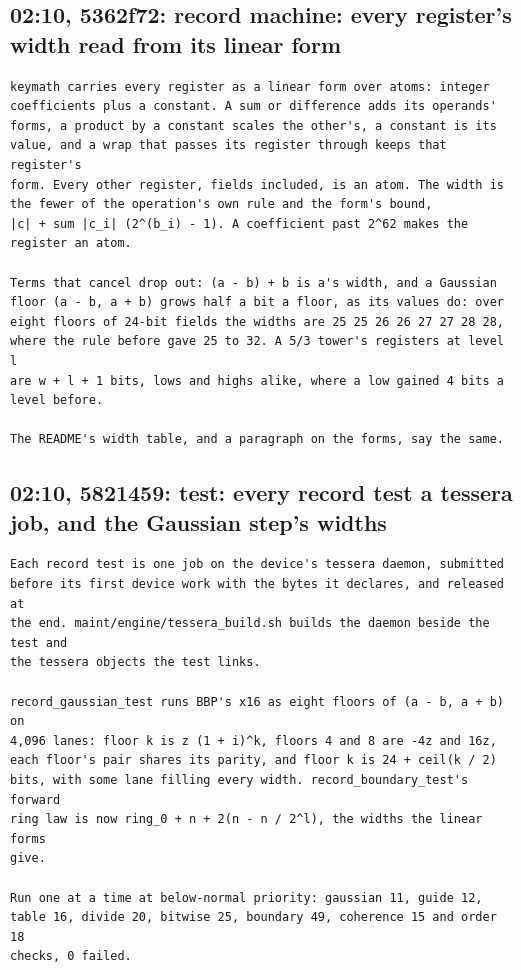 \subsection{\texorpdfstring{02:10, 5362f72: record machine: every register's width read from its linear form}{02:10, 5362f72: record machine: every register's width read from its linear form}}

\begin{Verbatim}
keymath carries every register as a linear form over atoms: integer
coefficients plus a constant. A sum or difference adds its operands'
forms, a product by a constant scales the other's, a constant is its
value, and a wrap that passes its register through keeps that register's
form. Every other register, fields included, is an atom. The width is
the fewer of the operation's own rule and the form's bound,
|c| + sum |c_i| (2^(b_i) - 1). A coefficient past 2^62 makes the
register an atom.

Terms that cancel drop out: (a - b) + b is a's width, and a Gaussian
floor (a - b, a + b) grows half a bit a floor, as its values do: over
eight floors of 24-bit fields the widths are 25 25 26 26 27 27 28 28,
where the rule before gave 25 to 32. A 5/3 tower's registers at level l
are w + l + 1 bits, lows and highs alike, where a low gained 4 bits a
level before.

The README's width table, and a paragraph on the forms, say the same.
\end{Verbatim}

\subsection{\texorpdfstring{02:10, 5821459: test: every record test a tessera job, and the Gaussian step's widths}{02:10, 5821459: test: every record test a tessera job, and the Gaussian step's widths}}

\begin{Verbatim}
Each record test is one job on the device's tessera daemon, submitted
before its first device work with the bytes it declares, and released at
the end. maint/engine/tessera_build.sh builds the daemon beside the test and
the tessera objects the test links.

record_gaussian_test runs BBP's x16 as eight floors of (a - b, a + b) on
4,096 lanes: floor k is z (1 + i)^k, floors 4 and 8 are -4z and 16z,
each floor's pair shares its parity, and floor k is 24 + ceil(k / 2)
bits, with some lane filling every width. record_boundary_test's forward
ring law is now ring_0 + n + 2(n - n / 2^l), the widths the linear forms
give.

Run one at a time at below-normal priority: gaussian 11, guide 12,
table 16, divide 20, bitwise 25, boundary 49, coherence 15 and order 18
checks, 0 failed.
\end{Verbatim}


